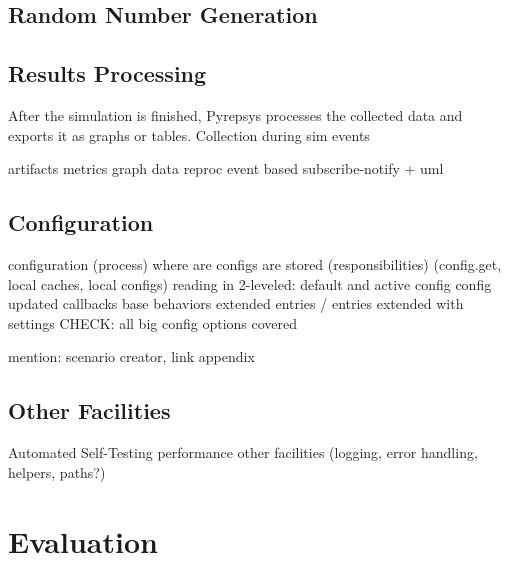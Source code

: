 \documentclass[%
    ]{\PathToTumTemplate/thesis/tum_thesis}
\begin{document}
\section{Random Number Generation}\label{sec:impl_rng}



\section{Results Processing}\label{sec:impl_results_processing}
After the simulation is finished, Pyrepsys processes the collected data and exports it as graphs or tables.
Collection during sim
events

artifacts
metrics
  graph
  data 
reproc
event based subscribe-notify + uml


\section{Configuration}\label{sec:impl_config}
configuration (process)
	where are configs are stored (responsibilities) (config.get, local caches, local configs)
	reading in
	2-leveled: default and active config
	config updated callbacks
	base behaviors
	extended entries / entries extended with settings
CHECK: all big config options covered

mention: scenario creator, link appendix


\section{Other Facilities}\label{sec:impl_misc}

Automated Self-Testing
performance
other facilities (logging, error handling, helpers, paths?)


\chapter{Evaluation} \label{chap:evaluation}
\end{document}

